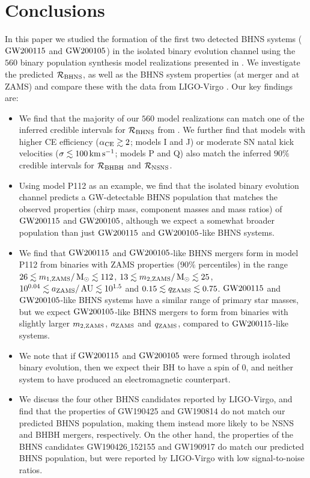 \documentclass{aastex63}
\newcommand{\monei}{\ensuremath{m_{1,\rm{ZAMS}}}\xspace}
\newcommand{\mtwoi}{\ensuremath{m_{2,\rm{ZAMS}}}\xspace}
\newcommand{\ai}{\ensuremath{a_{\rm{ZAMS}}}\xspace}
\newcommand{\qi}{\ensuremath{q_{\rm{ZAMS}}}\xspace}
\newcommand{\kms}{\ensuremath{\,\rm{km}\,\rm{s}^{-1}}\xspace}
\newcommand{\Msun}{\ensuremath{\,\rm{M}_{\odot}}\xspace}
\newcommand{\AU}{\ensuremath{\,\mathrm{AU}}\xspace}
\newcommand{\Rbhns}{\ensuremath{\mathcal{R}_{\rm{BHNS}}}\xspace}
\newcommand{\Rbhbh}{\ensuremath{\mathcal{R}_{\rm{BHBH}}}\xspace}
\newcommand{\Rnsns}{\ensuremath{\mathcal{R}_{\rm{NSNS}}}\xspace}
\newcommand{\Nmodels}{\ensuremath{560}\xspace}
\newcommand{\gwone}{\ensuremath{\rm{GW200115}}\xspace}
\newcommand{\gwzero}{\ensuremath{\rm{GW200105}}\xspace}
\newcommand{\model}{P112\xspace}
\begin{document}
\section{Conclusions}
\label{sec:conclusions}

In this paper we studied the formation of the first two detected \ac{BHNS} systems (\gwone and \gwzero) in the isolated binary evolution channel using the \Nmodels binary population synthesis model realizations presented in \citet{BroekgaardenDCOmergers:2021}. We investigate the predicted \Rbhns, as well as the \ac{BHNS} system properties (at merger and at ZAMS) and compare these with the data from LIGO-Virgo \citep{Abbott:2021-first-NSBH}. Our key findings are:

\begin{itemize}
    \item We find that the majority of our \Nmodels model realizations can match one of the inferred credible intervals for \Rbhns from \citet{Abbott:2021-first-NSBH}. We further find that models with higher \ac{CE} efficiency ($\alpha_{\rm{CE}}\gtrsim 2$; models I and J) or moderate \ac{SN} natal kick velocities ($\sigma\lesssim 100\kms$; models P and Q) also match the inferred $90\%$ credible intervals for \Rbhbh and \Rnsns.
    
    \item Using model \model as an example, we find that the isolated binary evolution channel predicts a \ac{GW}-detectable \ac{BHNS} population that matches the observed properties (chirp mass, component masses and mass ratios) of \gwone and \gwzero, although we expect a somewhat broader population than just \gwone and \gwzero-like \ac{BHNS} systems. 
    
    \item We find that \gwone and \gwzero-like \ac{BHNS} mergers form in model \model from binaries with ZAMS properties ($90\%$ percentiles) in the range $26 \lesssim \monei / \Msun \lesssim 112$,  $13 \lesssim \mtwoi / \Msun \lesssim 25$, $10^{0.04} \lesssim \ai / \AU \lesssim 10^{1.5}$ and $0.15 \lesssim \qi \lesssim 0.75$.  \gwone and \gwzero-like \ac{BHNS} systems have a similar range of primary star masses, but we expect \gwzero-like \ac{BHNS} mergers to form from binaries with slightly larger \mtwoi, \ai and \qi, compared to \gwone-like systems.
    
    \item We note that if \gwone and \gwzero were formed through isolated binary evolution, then we expect their \ac{BH} to have a spin of 0, and neither system to have produced an electromagnetic counterpart.
    
    \item We discuss the four other \ac{BHNS} candidates reported by LIGO-Virgo, and find that the properties of GW190425 and GW190814 do not match our predicted \ac{BHNS} population, making them instead more likely to be NSNS and BHBH mergers, respectively. On the other hand, the properties of the \ac{BHNS} candidates GW190426$\_$152155 and GW190917 do match our predicted \ac{BHNS} population, but were reported by LIGO-Virgo with low signal-to-noise ratios.
    
\end{itemize}
\end{document}
